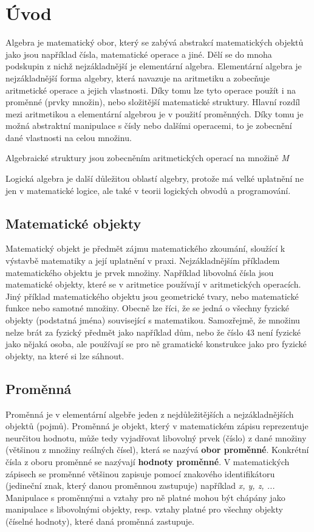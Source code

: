 \documentclass[11pt]{article}
\begin{document}
\pagestyle{empty}

\section{Úvod}

Algebra je matematický obor, který se zabývá abstrakcí matematických objektů jako jsou například čísla, matematické operace a jiné. Dělí se do mnoha podskupin z nichž nejzákladnější je elementární algebra. Elementární algebra je nejzákladnější forma algebry, která navazuje na aritmetiku a zobecňuje aritmetické operace a jejich vlastnosti. Díky tomu lze tyto operace použít i na proměnné (prvky množin), nebo složitější matematické struktury. Hlavní rozdíl mezi aritmetikou a elementární algebrou je v použití proměnných. Díky tomu je možná abstraktní manipulace s čísly nebo dalšími operacemi, to je zobecnění dané vlastnosti na celou množinu.

Algebraické struktury jsou zobecněním aritmetických operací na množině {\it M}

Logická algebra je další důležitou oblastí algebry, protože má velké uplatnění ne jen v matematické logice, ale také v teorii logických obvodů a programování.

\subsection{Matematické objekty}

Matematický objekt je předmět zájmu matematického zkoumání, sloužící k výstavbě matematiky a její uplatnění v praxi. Nejzákladnějším příkladem matematického objektu je prvek množiny. Například libovolná čísla jsou matematické objekty, které se v aritmetice používají v aritmetických operacích. Jiný příklad matematického objektu jsou geometrické tvary, nebo matematické funkce nebo samotné množiny. Obecně lze říci, že se jedná o všechny fyzické objekty (podstatná jména) související s matematikou. Samozřejmě, že množinu nelze brát za fyzický předmět jako například dům, nebo že číslo 43 není fyzické jako nějaká osoba, ale používají se pro ně gramatické konstrukce jako pro fyzické objekty, na které si lze sáhnout.

\subsection{Proměnná}

Proměnná je v elementární algebře jeden z nejdůležitějších a nejzákladnějších objektů (pojmů). Proměnná je objekt, který v matematickém zápisu reprezentuje neurčitou hodnotu, může tedy vyjadřovat libovolný prvek (číslo) z dané množiny (většinou z množiny reálných čísel), která se nazývá {\bf obor proměnné}. Konkrétní čísla z oboru proměnné se nazývají {\bf hodnoty proměnné}. V matematických zápisech se proměnné většinou zapisuje pomocí znakového identifikátoru (jedineční znak, který danou proměnnou zastupuje) například {\it x, y, z, ...} Manipulace s proměnnými a vztahy pro ně platné mohou být chápány jako manipulace s libovolnými objekty, resp. vztahy platné pro všechny objekty (číselné hodnoty), které daná proměnná zastupuje.
\end{document}
